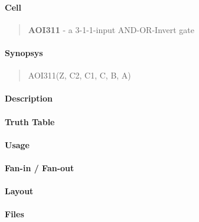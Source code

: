 \label{AOI311}
\paragraph{Cell}
\begin{quote}
    \textbf{AOI311} - a 3-1-1-input AND-OR-Invert gate
\end{quote}

\paragraph{Synopsys}
\begin{quote}
    AOI311(Z, C2, C1, C, B, A)
\end{quote}

\paragraph{Description}



\paragraph{Truth Table}


\paragraph{Usage}

\paragraph{Fan-in / Fan-out}

\paragraph{Layout}

\paragraph{Files}
